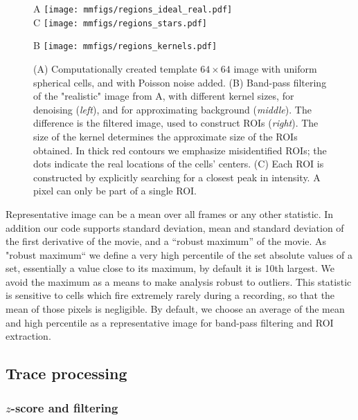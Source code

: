 \documentclass[a4paper,11pt,oneside,]{article}
\begin{document}
\begin{figure}[t]
\centering
\begin{minipage}{.25\textwidth}
    \vskip 2mm
    {\selectfont A} \texttt{[image: mmfigs/regions\_ideal\_real.pdf]}\\
    {\selectfont C} \texttt{[image: mmfigs/regions\_stars.pdf]}
\end{minipage}
\begin{minipage}{.6\textwidth}
    \vskip 7mm
    {\selectfont B} \texttt{[image: mmfigs/regions\_kernels.pdf]}
\end{minipage}
\caption{
(A) Computationally created template $64{\times}64$ image with uniform spherical cells, and with Poisson noise added.
(B) Band-pass filtering of the "realistic" image from A, with different kernel sizes, for denoising  ({\it left}), and  for approximating background  ({\it middle}).
The difference is the filtered image, used to construct ROIs ({\it right}).
The size of the kernel determines the approximate size of the ROIs obtained.
In thick red contours we emphasize misidentified ROIs; the dots indicate the real locations of the cells' centers.
(C) Each ROI is constructed by explicitly searching for a closest peak in intensity. A pixel can only be part of a single ROI.
\label{fig:regions}}
\end{figure}

Representative image can be a mean over all frames or any other statistic.
In addition our code supports standard deviation, mean and standard deviation of the first derivative of the movie, and a ``robust maximum'' of the movie.
As "robust maximum`` we define a very high percentile of the set absolute values of a set, essentially a value close to its maximum, by default it is 10th largest. 
We avoid the maximum as a means to make analysis robust to outliers.
This statistic is sensitive to cells which fire extremely rarely during a recording, so that the mean of those pixels is negligible.
By default, we choose an average of the mean and high percentile as a representative image for band-pass filtering and ROI extraction.

\subsection{Trace processing}

\subsubsection{$z$-score and filtering}
\end{document}
